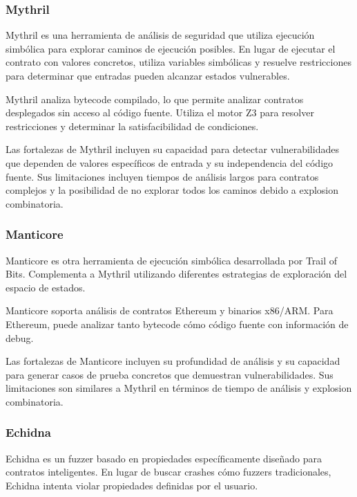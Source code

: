 \documentclass[12pt,a4paper,twoside]{book}
\begin{document}
\subsubsection{Mythril}

Mythril es una herramienta de análisis de seguridad que utiliza ejecución simbólica para explorar caminos de ejecución posibles. En lugar de ejecutar el contrato con valores concretos, utiliza variables simbólicas y resuelve restricciones para determinar que entradas pueden alcanzar estados vulnerables.

Mythril analiza bytecode compilado, lo que permite analizar contratos desplegados sin acceso al código fuente. Utiliza el motor Z3 para resolver restricciones y determinar la satisfacibilidad de condiciones.

Las fortalezas de Mythril incluyen su capacidad para detectar vulnerabilidades que dependen de valores específicos de entrada y su independencia del código fuente. Sus limitaciones incluyen tiempos de análisis largos para contratos complejos y la posibilidad de no explorar todos los caminos debido a explosion combinatoria.

\subsubsection{Manticore}

Manticore es otra herramienta de ejecución simbólica desarrollada por Trail of Bits. Complementa a Mythril utilizando diferentes estrategias de exploración del espacio de estados.

Manticore soporta análisis de contratos Ethereum y binarios x86/ARM. Para Ethereum, puede analizar tanto bytecode cómo código fuente con información de debug.

Las fortalezas de Manticore incluyen su profundidad de análisis y su capacidad para generar casos de prueba concretos que demuestran vulnerabilidades. Sus limitaciones son similares a Mythril en términos de tiempo de análisis y explosion combinatoria.

\subsubsection{Echidna}

Echidna es un fuzzer basado en propiedades específicamente diseñado para contratos inteligentes. En lugar de buscar crashes cómo fuzzers tradicionales, Echidna intenta violar propiedades definidas por el usuario.
\end{document}
